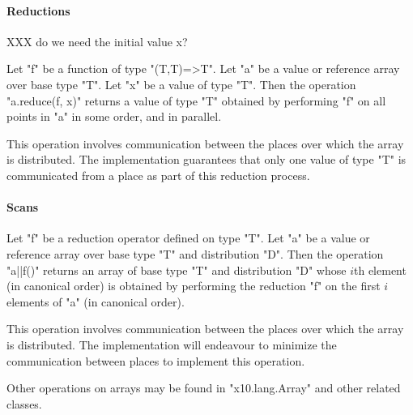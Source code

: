 \paragraph{Reductions}\label{ArrayReductions}

XXX do we need the initial value x?

Let \xcd"f" be a function of type \xcd"(T,T)=>T".  Let
\xcd"a" be a value or reference array over base type \xcd"T".
Let \xcd"x" be a value of type \xcd"T".
Then the
operation \xcd"a.reduce(f, x)" returns a value of type \xcd"T" obtained
by performing \xcd"f" on all points in \xcd"a" in some order, and in
parallel.

This operation involves communication between the places over which
the array is distributed. The \Xten{} implementation guarantees that
only one value of type \xcd"T" is communicated from a place as part of
this reduction process.

\paragraph{Scans}\label{ArrayScans}

Let \xcd"f" be a reduction operator defined on type \xcd"T". Let
\xcd"a" be a value or reference array over base type \xcd"T" and
distribution \xcd"D". Then the operation \xcd"a||f()" returns an array
of base type \xcd"T" and distribution \xcd"D" whose $i$th element
(in canonical order) is obtained by performing the reduction \xcd"f"
on the first $i$ elements of \xcd"a" (in canonical order).

This operation involves communication between the places over which
the array is distributed. The \Xten{} implementation will endeavour to
minimize the communication between places to implement this operation.

Other operations on arrays may be found in \xcd"x10.lang.Array" and
other related classes.
